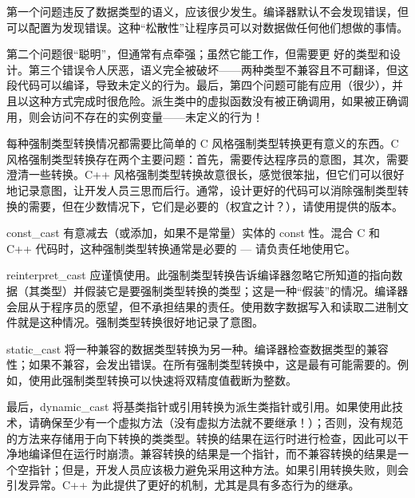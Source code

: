 
第一个问题违反了数据类型的语义，应该很少发生。编译器默认不会发现错误，但可以配置为发现错误。这种“松散性”让程序员可以对数据做任何他们想做的事情。

第二个问题很“聪明”，但通常有点牵强；虽然它能工作，但需要更 好的类型和设计。第三个错误令人厌恶，语义完全被破坏——两种类型不兼容且不可翻译，但这段代码可以编译，导致未定义的行为。最后，第四个问题可能有应用（很少），并且以这种方式完成时很危险。派生类中的虚拟函数没有被正确调用，如果被正确调用，则会访问不存在的实例变量——未定义的行为！


每种强制类型转换情况都需要比简单的 C 风格强制类型转换更有意义的东西。C 风格强制类型转换存在两个主要问题：首先，需要传达程序员的意图，其次，需要澄清一些转换。C++ 风格强制类型转换故意很长，感觉很笨拙，但它们可以很好地记录意图，让开发人员三思而后行。通常，设计更好的代码可以消除强制类型转换的需要，但在少数情况下，它们是必要的（权宜之计？），请使用提供的版本。

const\_cast 有意减去（或添加，如果不是常量）实体的 const 性。混合 C 和 C++ 代码时，这种强制类型转换通常是必要的 — 请负责任地使用它。

reinterpret\_cast 应谨慎使用。此强制类型转换告诉编译器忽略它所知道的指向数据（其类型）并假装它是要强制类型转换的类型；这是一种“假装”的情况。编译器会屈从于程序员的愿望，但不承担结果的责任。使用数字数据写入和读取二进制文件就是这种情况。强制类型转换很好地记录了意图。

static\_cast 将一种兼容的数据类型转换为另一种。编译器检查数据类型的兼容性；如果不兼容，会发出错误。在所有强制类型转换中，这是最有可能需要的。例 如，使用此强制类型转换可以快速将双精度值截断为整数。

最后，dynamic\_cast 将基类指针或引用转换为派生类指针或引用。如果使用此技术，请确保至少有一个虚拟方法（没有虚拟方法就不要继承！）；否则，没有规范的方法来存储用于向下转换的类类型。转换的结果在运行时进行检查，因此可以干净地编译但在运行时崩溃。兼容转换的结果是一个指针，而不兼容转换的结果是一个空指针；但是，开发人员应该极力避免采用这种方法。如果引用转换失败，则会引发异常。C++ 为此提供了更好的机制，尤其是具有多态行为的继承。


